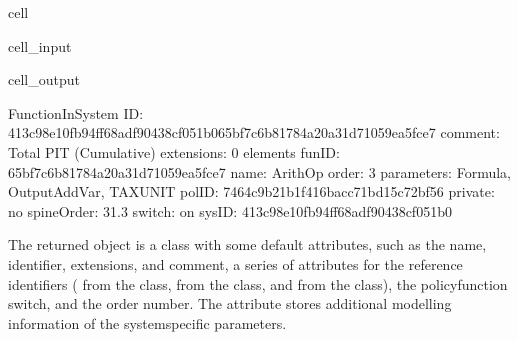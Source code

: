 \documentclass[letterpaper,10pt,english]{sphinxmanual}
\begin{document}
\begin{sphinxuseclass}{cell}
\begin{sphinxuseclass}{cell_input}
\begin{sphinxVerbatim}[commandchars=\\\{\}]
\PYG{p}{[}\PYG{p}{]}\PYG{p}{[}\PYG{p}{]}\PYG{p}{[}\PYG{p}{]}\PYG{p}{[}\PYG{p}{]}
\end{sphinxVerbatim}

\end{sphinxuseclass}
\begin{sphinxuseclass}{cell_output}
\begin{sphinxVerbatim}[commandchars=\\\{\}]
\PYGZhy{}\PYGZhy{}\PYGZhy{}\PYGZhy{}\PYGZhy{}\PYGZhy{}\PYGZhy{}\PYGZhy{}\PYGZhy{}\PYGZhy{}\PYGZhy{}\PYGZhy{}\PYGZhy{}\PYGZhy{}\PYGZhy{}\PYGZhy{}\PYGZhy{}\PYGZhy{}\PYGZhy{}\PYGZhy{}\PYGZhy{}\PYGZhy{}\PYGZhy{}\PYGZhy{}\PYGZhy{}\PYGZhy{}\PYGZhy{}\PYGZhy{}\PYGZhy{}\PYGZhy{}
FunctionInSystem
\PYGZhy{}\PYGZhy{}\PYGZhy{}\PYGZhy{}\PYGZhy{}\PYGZhy{}\PYGZhy{}\PYGZhy{}\PYGZhy{}\PYGZhy{}\PYGZhy{}\PYGZhy{}\PYGZhy{}\PYGZhy{}\PYGZhy{}\PYGZhy{}\PYGZhy{}\PYGZhy{}\PYGZhy{}\PYGZhy{}\PYGZhy{}\PYGZhy{}\PYGZhy{}\PYGZhy{}\PYGZhy{}\PYGZhy{}\PYGZhy{}\PYGZhy{}\PYGZhy{}\PYGZhy{}
	 ID: \PYGZsq{}413c98e1\PYGZhy{}0fb9\PYGZhy{}4ff6\PYGZhy{}8adf\PYGZhy{}90438cf051b065bf7c6b\PYGZhy{}8178\PYGZhy{}4a20\PYGZhy{}a31d\PYGZhy{}71059ea5fce7\PYGZsq{}
	 comment: \PYGZsq{}Total PIT (Cumulative)\PYGZsq{}
	 extensions: 0 elements
	 funID: \PYGZsq{}65bf7c6b\PYGZhy{}8178\PYGZhy{}4a20\PYGZhy{}a31d\PYGZhy{}71059ea5fce7\PYGZsq{}
	 name: \PYGZsq{}ArithOp\PYGZsq{}
	 order: \PYGZsq{}3\PYGZsq{}
	 parameters: Formula, Output\PYGZus{}Add\PYGZus{}Var, TAX\PYGZus{}UNIT
	 polID: \PYGZsq{}7464c9b2\PYGZhy{}1b1f\PYGZhy{}416b\PYGZhy{}acc7\PYGZhy{}1bd15c72bf56\PYGZsq{}
	 private: \PYGZsq{}no\PYGZsq{}
	 spineOrder: \PYGZsq{}31.3\PYGZsq{}
	 switch: \PYGZsq{}on\PYGZsq{}
	 sysID: \PYGZsq{}413c98e1\PYGZhy{}0fb9\PYGZhy{}4ff6\PYGZhy{}8adf\PYGZhy{}90438cf051b0\PYGZsq{}
\end{sphinxVerbatim}

\end{sphinxuseclass}
\end{sphinxuseclass}
\sphinxAtStartPar
The returned object is a  class with some default attributes, such as the name, identifier, extensions, and comment, a series of attributes for the reference identifiers ( from the  class,  from the  class, and  from the  class), the policy\sphinxhyphen{}function switch, and the order number. The attribute  stores additional modelling information of the system\sphinxhyphen{}specific parameters.
\end{document}
